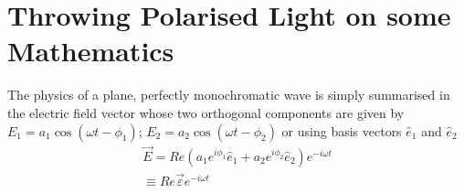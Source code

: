 \chapter[Throwing Polarised Light on some Mathematics]{Throwing Polarised Light on some Mathematics}\label{chap13}



The physics of a plane, perfectly monochromatic wave is simply summarised
in the electric field vector whose two orthogonal components are given by
$E_1 = a_1 \cos(\omega t - \phi_1)$; $E_2 = a_2 \cos(\omega t - \phi_2)$ or using basis vectors $\hat{e}_1$ and $\hat{e}_2$
\begin{gather*}
\overrightarrow{E} = Re (a_1 e^{i \phi_1 } \hat{e}_1 + a_2 e^{i\phi_2} \hat{e}_2 ) e^{-i\omega t} \\
\equiv Re \overrightarrow{\varepsilon} e^{-i\omega t}
\end{gather*}

